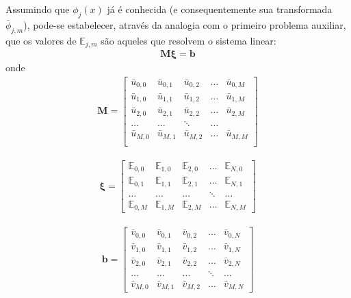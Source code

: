 Assumindo que $\phi_j(x)$ já é conhecida (e consequentemente sua transformada $\bar{\phi}_{j, m}$), pode-se estabelecer, através da analogia com o primeiro problema auxiliar, que os valores de $\mathbb{E}_{j,m}$ são aqueles que resolvem o sistema linear:
\begin{align}
\mathbf{M}\mathbf{\xi} = \mathbf{b} \label{sistema_para_coeficientes_21}
\end{align}
onde
\begin{align}
\mathbf{M} =
\begin{bmatrix}
\bar{u}_{0,0} & \bar{u}_{0,1} & \bar{u}_{0,2} & \ldots & \bar{u}_{0,M} \\
\bar{u}_{1,0} & \bar{u}_{1,1} & \bar{u}_{1,2} & \ldots & \bar{u}_{1,M} \\
\bar{u}_{2,0} & \bar{u}_{2,1} & \bar{u}_{2,2} & \ldots & \bar{u}_{2,M} \\
\ldots & \ldots & \ddots & \ldots\\
\bar{u}_{M,0} & \bar{u}_{M,1} & \bar{u}_{M,2} & \ldots & \bar{u}_{M,M} \\
\end{bmatrix}
\end{align}

\begin{align}
\mathbf{\xi}
=
\begin{bmatrix}
\mathbb{E}_{0,0} & \mathbb{E}_{1,0} & \mathbb{E}_{2,0} & \ldots & \mathbb{E}_{N,0} \\
\mathbb{E}_{0,1} & \mathbb{E}_{1,1} & \mathbb{E}_{2,1} & \ldots & \mathbb{E}_{N,1} \\
\ldots & \ldots & \ldots & \ddots & \ldots \\
\mathbb{E}_{0,M} & \mathbb{E}_{1,M} & \mathbb{E}_{2,M} & \ldots & \mathbb{E}_{N,M}
\end{bmatrix}
\end{align}

\begin{align}
\mathbf{b}
=
\begin{bmatrix}
\bar{v}_{0, 0} & \bar{v}_{0, 1} &\bar{v}_{0, 2} & \ldots & \bar{v}_{0, N} \\
\bar{v}_{1, 0} & \bar{v}_{1, 1} &\bar{v}_{1, 2} & \ldots & \bar{v}_{1, N} \\
\bar{v}_{2, 0} & \bar{v}_{2, 1} &\bar{v}_{2, 2} & \ldots & \bar{v}_{2, N} \\
\ldots & \ldots & \ldots & \ddots & \ldots \\
\bar{v}_{M, 0} & \bar{v}_{M, 1} &\bar{v}_{M, 2} & \ldots & \bar{v}_{M, N}
\end{bmatrix}
\end{align}


